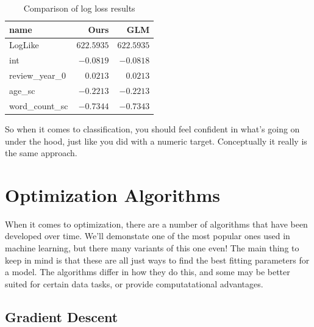\documentclass[
  letterpaper,
]{krantz}
\begin{document}
\begin{longtable}{lrr}

\caption{\label{tbl-logloss}Comparison of log loss results}

\tabularnewline

\toprule
name & Ours & GLM \\ 
\midrule\addlinespace[2.5pt]
LogLike & \textcolor[HTML]{404040}{$622.5935$} & \textcolor[HTML]{404040}{$622.5935$} \\ 
int & \textcolor[HTML]{404040}{$-0.0819$} & \textcolor[HTML]{404040}{$-0.0818$} \\ 
review\_year\_0 & \textcolor[HTML]{404040}{$0.0213$} & \textcolor[HTML]{404040}{$0.0213$} \\ 
age\_sc & \textcolor[HTML]{404040}{$-0.2213$} & \textcolor[HTML]{404040}{$-0.2213$} \\ 
word\_count\_sc & \textcolor[HTML]{404040}{$-0.7344$} & \textcolor[HTML]{404040}{$-0.7343$} \\ 
\bottomrule

\end{longtable}

So when it comes to classification, you should feel confident in what's
going on under the hood, just like you did with a numeric target.
Conceptually it really is the same approach.

\section{Optimization Algorithms}\label{sec-estim-opt-algos}

When it comes to optimization, there are a number of algorithms that
have been developed over time. We'll demonstate one of the most popular
ones used in machine learning, but there many variants of this one even!
The main thing to keep in mind is that these are all just ways to find
the best fitting parameters for a model. The algorithms differ in how
they do this, and some may be better suited for certain data tasks, or
provide computatational advantages.

\subsection{Gradient Descent}\label{sec-estim-opt-algos-gd}
\end{document}
